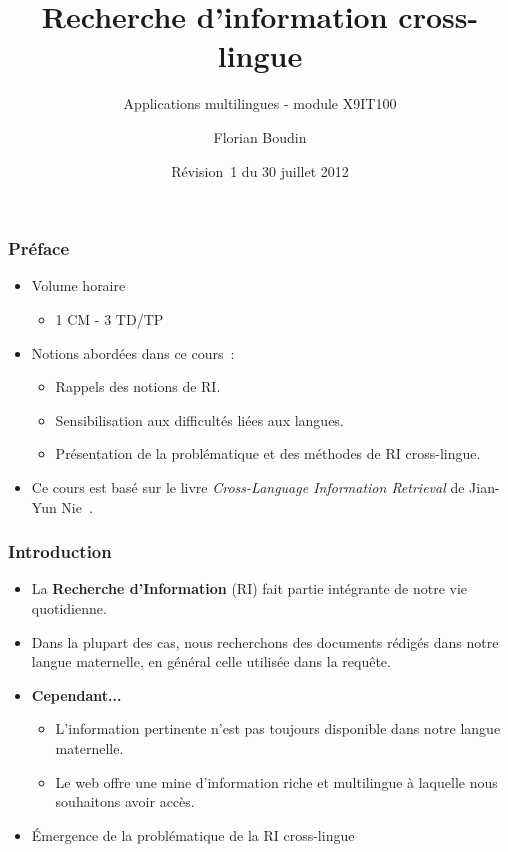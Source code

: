 \documentclass[12pt,aspectratio=43,dvipsnames,table]{beamer}
\title{Recherche d'information cross-lingue}
\subtitle{Applications multilingues - module X9IT100}
\author{Florian Boudin}
\institute{Département informatique, Université de Nantes}
\date[30 juillet 2013 / Rév.~1]{Révision~1 du 30 juillet 2012}
\begin{document}
\frame[plain]{\titlepage}


\begin{frame}
    \frametitle{Préface}
    \begin{itemize} \itemsep10pt
        \item Volume horaire
        \begin{itemize}
            \item 1 CM - 3 TD/TP
        \end{itemize}
        \item Notions abordées dans ce cours~:
        \begin{itemize}
            \item Rappels des notions de RI.
            \item Sensibilisation aux difficultés liées aux langues.
            \item Présentation de la problématique et des méthodes de RI 
                  cross-lingue.
        \end{itemize}
        \item Ce cours est basé sur le livre \textit{Cross-Language Information 
              Retrieval} de Jian-Yun Nie~\cite{DBLP:series/synthesis/2010Nie}.
    \end{itemize}
\end{frame}


\begin{frame}
    \frametitle{Introduction}
    \begin{itemize} \itemsep10pt
        \item La \textbf{Recherche d'Information} (RI) fait partie intégrante de
              notre vie quotidienne.
        \item Dans la plupart des cas, nous recherchons des documents rédigés 
              dans notre langue maternelle, en général celle utilisée dans la 
              requête.
        \item \textbf{Cependant...}
        \begin{itemize}
            \item L'information pertinente n'est pas toujours disponible dans 
                  notre langue maternelle.
            \item Le web offre une mine d'information riche et multilingue à 
                  laquelle nous souhaitons avoir accès.
        \end{itemize}
        \item \'Emergence de la problématique de la RI cross-lingue
    \end{itemize}
\end{frame}
\end{document}
